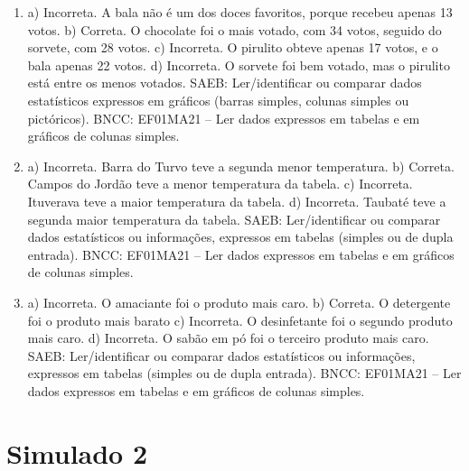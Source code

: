\begin{enumerate}
\item
a) Incorreta. A bala não é um dos doces favoritos, porque recebeu apenas 13 votos.
b) Correta. O chocolate foi o mais votado, com 34 votos, seguido do sorvete, com 28 votos.
c) Incorreta. O pirulito obteve apenas 17 votos, e o bala apenas 22 votos.
d) Incorreta. O sorvete foi bem votado, mas o pirulito está entre os menos votados.
SAEB: Ler/identificar ou comparar dados estatísticos expressos
em gráficos (barras simples, colunas simples ou pictóricos).
BNCC: EF01MA21 -- Ler dados expressos em tabelas e em gráficos de colunas
simples.

\item
a) Incorreta. Barra do Turvo teve a segunda menor temperatura.
b) Correta. Campos do Jordão teve a menor temperatura da tabela.
c) Incorreta. Ituverava teve a maior temperatura da tabela.
d) Incorreta. Taubaté teve a segunda maior temperatura da tabela.
SAEB: Ler/identificar ou comparar dados estatísticos ou
informações, expressos em tabelas (simples ou de dupla entrada).
BNCC: EF01MA21 -- Ler dados expressos em tabelas e em gráficos de colunas
simples.

\item
a) Incorreta. O amaciante foi o produto mais caro.
b) Correta. O detergente foi o produto mais barato
c) Incorreta. O desinfetante foi o segundo produto mais caro.
d) Incorreta. O sabão em pó foi o terceiro produto mais caro.
SAEB: Ler/identificar ou comparar dados estatísticos ou
informações, expressos em tabelas (simples ou de dupla entrada).
BNCC: EF01MA21 -- Ler dados expressos em tabelas e em gráficos de colunas
simples.
\end{enumerate}

\section*{Simulado 2}

